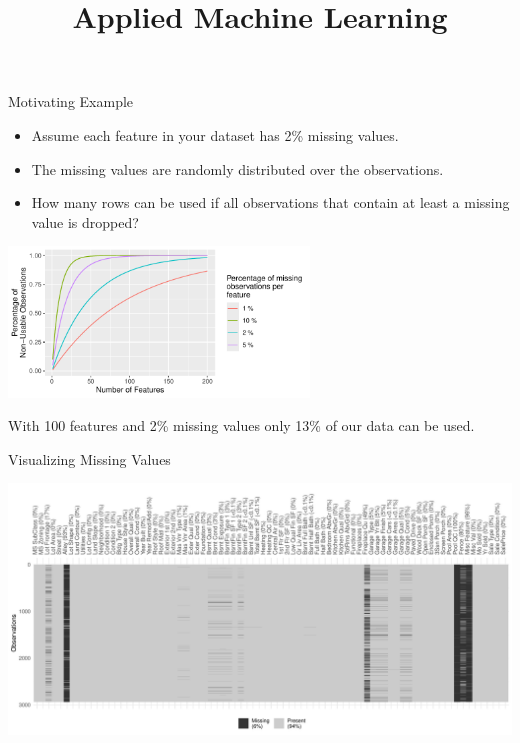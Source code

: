 \documentclass[11pt,compress,t,notes=noshow, xcolor=table]{beamer}
\title{Applied Machine Learning}
\date{}
\begin{document}
 


\begin{frame}{Motivating Example}

    \begin{itemize}
        \item Assume each feature in your dataset has 2\% missing values.
        \item The missing values are randomly distributed over the observations.
        \item How many rows can be used if all observations that contain at least a missing value is dropped?
    \end{itemize}
    
    \begin{center}
        \includegraphics[width=0.6\textwidth]{figure/missing_values_plot}
    \end{center}
    
    With 100 features and 2\% missing values only 13\% of our data can be used.

\end{frame}

\begin{frame}{Visualizing Missing Values}

    \begin{center}
        \includegraphics[width=\textwidth]{figure/missing_values_visualization}
    \end{center}

\end{frame}
\end{document}
